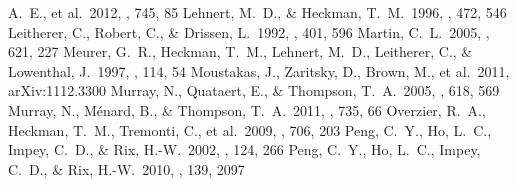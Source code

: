 \documentclass[apj]{emulateapj}
\begin{document}
\begin{thebibliography}{}
  A.~E., et al.\ 2012, \apj, 745, 85
 Lehnert, M.~D., \& Heckman,
  T.~M.\ 1996, \apj, 472, 546
 Leitherer, C., Robert, C., \&
  Drissen, L.\ 1992, \apj, 401, 596
 Martin, C.~L.\ 2005, \apj, 621, 227
 Meurer, G.~R., Heckman, T.~M.,
  Lehnert, M.~D., Leitherer, C., \& Lowenthal, J.\ 1997, \aj, 114, 54
 Moustakas, J., Zaritsky, D.,
  Brown, M., et al.\ 2011, arXiv:1112.3300
 Murray, N., Quataert, E., \&
  Thompson, T.~A.\ 2005, \apj, 618, 569
 Murray, N., M{\'e}nard, B., \&
  Thompson, T.~A.\ 2011, \apj, 735, 66
 Overzier, R.~A., Heckman,
  T.~M., Tremonti, C., et al.\ 2009, \apj, 706, 203
 Peng, C.~Y., Ho, L.~C., Impey,
  C.~D., \& Rix, H.-W.\ 2002, \aj, 124, 266
 Peng, C.~Y., Ho, L.~C., Impey,
  C.~D., \& Rix, H.-W.\ 2010, \aj, 139, 2097

\end{thebibliography}
\end{document}
